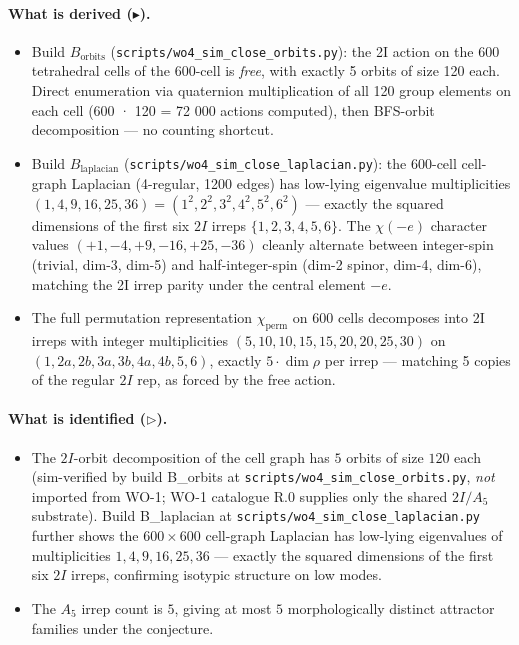\documentclass[12pt]{article}
\begin{document}
\paragraph{What is derived ($\blacktriangleright$).}
\begin{itemize}
\item Build $B_{\mathrm{orbits}}$ (\texttt{scripts/wo4\_sim\_close\_orbits.py}):
  the 2I action on the 600 tetrahedral cells of the 600-cell is
  \emph{free}, with exactly 5 orbits of size 120 each. Direct
  enumeration via quaternion multiplication of all 120 group
  elements on each cell (600 · 120 = 72 000 actions computed),
  then BFS-orbit decomposition — no counting shortcut.
\item Build $B_{\mathrm{laplacian}}$ (\texttt{scripts/wo4\_sim\_close\_laplacian.py}):
  the 600-cell cell-graph Laplacian (4-regular, 1200 edges) has
  low-lying eigenvalue multiplicities
  $(1, 4, 9, 16, 25, 36) = (1^2, 2^2, 3^2, 4^2, 5^2, 6^2)$ — exactly
  the squared dimensions of the first six $2I$ irreps
  $\{1, 2, 3, 4, 5, 6\}$. The $\chi(-e)$ character values
  $(+1, -4, +9, -16, +25, -36)$ cleanly alternate between
  integer-spin (trivial, dim-3, dim-5) and half-integer-spin
  (dim-2 spinor, dim-4, dim-6), matching the 2I irrep parity
  under the central element $-e$.
\item The full permutation representation $\chi_{\mathrm{perm}}$
  on 600 cells decomposes into 2I irreps with integer
  multiplicities $(5, 10, 10, 15, 15, 20, 20, 25, 30)$ on
  $(1, 2a, 2b, 3a, 3b, 4a, 4b, 5, 6)$, exactly $5 \cdot \dim \rho$
  per irrep — matching 5 copies of the regular $2I$ rep, as
  forced by the free action.
\end{itemize}

\paragraph{What is identified ($\triangleright$).}
\begin{itemize}
\item The $2I$-orbit decomposition of the cell graph has $5$
  orbits of size $120$ each (sim-verified by build B\_orbits at
  \texttt{scripts/wo4\_sim\_close\_orbits.py}, \emph{not} imported
  from WO-1; WO-1 catalogue R.0 supplies only the shared
  $2I/A_5$ substrate). Build B\_laplacian at
  \texttt{scripts/wo4\_sim\_close\_laplacian.py} further shows
  the $600 \times 600$ cell-graph Laplacian has
  low-lying eigenvalues of multiplicities $1, 4, 9, 16, 25, 36$
  — exactly the squared dimensions of the first six $2I$
  irreps, confirming isotypic structure on low modes.
\item The $A_5$ irrep count is $5$, giving at most $5$
  morphologically distinct attractor families under the conjecture.
\end{itemize}
\end{document}
